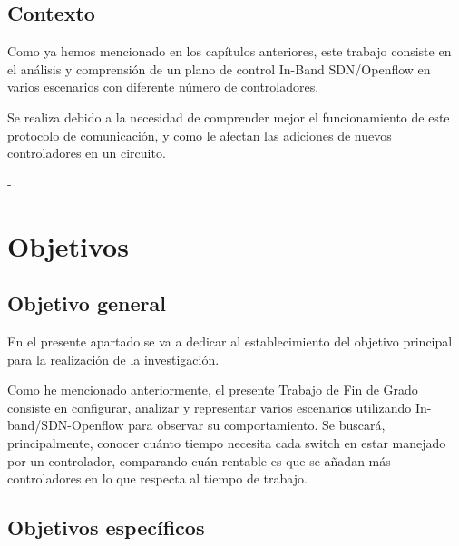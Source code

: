 \documentclass[a4paper, 12pt]{book}
\begin{document}
	\section{Contexto}
	\label{sec:contexto}
	
	Como ya hemos mencionado en los capítulos anteriores, este trabajo consiste en el análisis y comprensión de un plano de control In-Band SDN/Openflow en varios escenarios con diferente número de controladores.
	
	Se realiza debido a la necesidad de comprender mejor el funcionamiento de este protocolo de comunicación, y como le afectan las adiciones de nuevos controladores en un circuito.
	

	- 
	

	
	
	\cleardoublepage %
	\chapter{Objetivos} %
	\label{chap:objetivos} %
	
	\section{Objetivo general} %
	\label{sec:objetivo-general} %
	
	En el presente apartado se va a dedicar al establecimiento del objetivo principal para la realización de la investigación. 
	
	Como he mencionado anteriormente, el presente Trabajo de Fin de Grado consiste en configurar, analizar y representar varios escenarios utilizando In-band/SDN-Openflow para observar su comportamiento. Se buscará, principalmente, conocer cuánto tiempo necesita cada switch en estar manejado por un controlador, comparando cuán  rentable es que se añadan más controladores en lo que respecta al tiempo de trabajo.
	
	
	\section{Objetivos específicos}
	\label{sec:objetivos-especificos}
	
\end{document}
